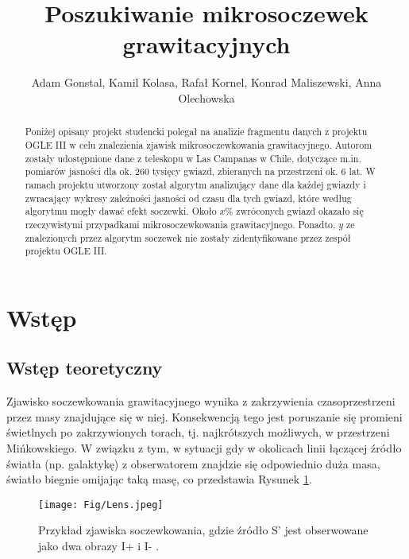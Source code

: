 \documentclass[a4paper,11pt]{article}
\author{Adam Gonstal, Kamil Kolasa, Rafał Kornel, Konrad Maliszewski, Anna Olechowska}
\title{Poszukiwanie mikrosoczewek grawitacyjnych}
\newcommand{\ak}{\hspace{0.7 cm}}
\begin{document}
\maketitle
\newpage
\tableofcontents
\newpage
\begin{abstract}
\nocite{*}
\ak Poniżej opisany projekt studencki polegał na analizie fragmentu danych z projektu OGLE III w celu znalezienia zjawisk mikrosoczewkowania grawitacyjnego.  Autorom zostały udostępnione dane z teleskopu w Las Campanas w Chile, dotyczące m.in. pomiarów jasności dla ok. $260$ tysięcy  gwiazd, zbieranych na przestrzeni ok. $6$ lat. W ramach projektu utworzony został algorytm analizujący dane dla każdej gwiazdy i zwracający wykresy zależności jasności od czasu dla tych gwiazd, które według algorytmu mogły dawać efekt soczewki. Około $x\%$ zwróconych gwiazd okazało się rzeczywistymi przypadkami mikrosoczewkowania grawitacyjnego. Ponadto, $y$ ze znalezionych przez algorytm soczewek nie zostały zidentyfikowane przez zespół projektu OGLE III.
\end{abstract}
\section{Wstęp}
\subsection{Wstęp teoretyczny}
\ak Zjawisko soczewkowania grawitacyjnego wynika z zakrzywienia czasoprzestrzeni przez masy znajdujące się w niej. Konsekwencją tego jest poruszanie się promieni świetlnych po zakrzywionych torach, tj. najkrótszych możliwych, w przestrzeni Mińkowskiego. W związku z tym, w sytuacji gdy w okolicach linii łączącej źródło światła (np. galaktykę) z obserwatorem znajdzie się odpowiednio duża masa, światło biegnie omijając taką masę, co przedstawia Rysunek \ref{Fig_1}. 

\begin{figure}[h]
\centering
\texttt{[image: Fig/Lens.jpeg]}
\label{Fig_1}
\caption{Przykład zjawiska soczewkowania, gdzie źródło S' jest obserwowane jako dwa obrazy I+ i I- \citet{Lens}.}
\end{figure}
\end{document}
